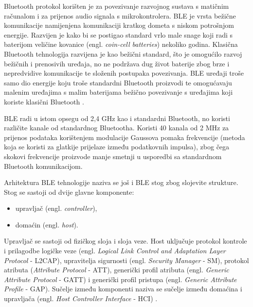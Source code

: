 Bluetooth protokol korišten je za povezivanje razvojnog sustava s matičnim računalom i za prijenos audio signala s mikrokontrolera. BLE je vrsta bežične komunikacije namijenjena komunikaciji kratkog dometa s niskom potrošnjom energije. Razvijen je kako bi se postigao standard vrlo male snage koji radi s baterijom veličine kovanice (engl. \textit{coin-cell batteries}) nekoliko godina.
Klasična Bluetooth tehnologija razvijena je kao bežični standard, što je omogućilo razvoj bežičnih i prenosivih uređaja, no ne podržava dug život baterije zbog brze i nepredvidive komunikacije te složenih postupaka povezivanja. BLE uređaji troše samo dio energije koju troše standardni Bluetooth proizvodi te omogućavaju malenim uređajima s malim baterijama bežično povezivanje s uređajima koji koriste klasični Bluetooth \cite{blevsbluetooth}. 

BLE radi u istom opsegu od 2,4 GHz kao i standardni Bluetooth, no koristi različite kanale od standardnog Bluetootha. Koristi 40 kanala od 2 MHz za prijenos podataka korištenjem modulacije Gaussova pomaka frekvencije (metoda koja se koristi za glatkije prijelaze između podatkovnih impulsa), zbog čega skokovi frekvencije proizvode manje smetnji u usporedbi sa standardnom Bluetooth komunikacijom.

Arhitektura BLE tehnologije naziva se još i BLE stog zbog slojevite strukture. Stog se sastoji od dvije glavne komponente:
\begin{itemize}
	\item upravljač (engl. \textit{controller}),
	\item domaćin (engl. \textit{host}).
\end{itemize}

Upravljač se sastoji od fizičkog sloja i sloja veze. Host uključuje protokol kontrole i prilagodbe logičke veze (engl. \textit{Logical Link Control and Adaptation Layer Protocol} - L2CAP), upravitelja sigurnosti (engl. \textit{Security Manager} - SM), protokol atributa (\textit{Attribute Protocol} - ATT), generički profil atributa (engl. \textit{Generic Attribute Protocol} - GATT) i generički profil pristupa (engl. \textit{Generic Attribute Profile} - GAP). Sučelje između komponenti naziva se sučelje između domaćina i upravljača (engl. \textit{Host Controller Interface} - HCI) \cite{blemanual}. 


